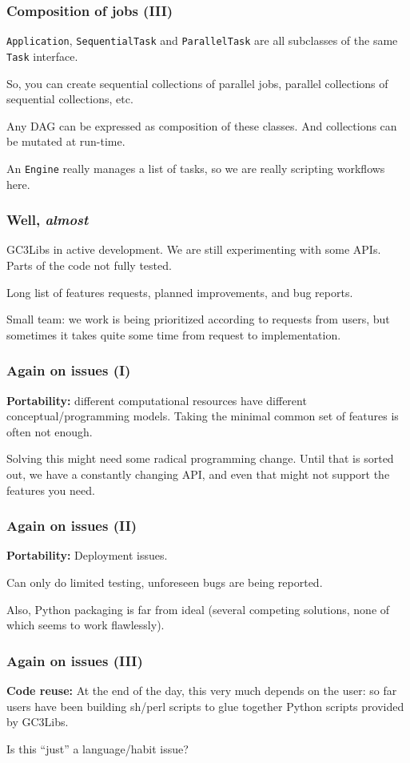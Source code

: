 \documentclass[presentation]{beamer}
\begin{document}
\begin{frame}
\frametitle{Composition of jobs (III)}
\label{sec-25}

  \texttt{Application}, \texttt{SequentialTask} and \texttt{ParallelTask} are all
  subclasses of the same \texttt{Task} interface.

  So, you can create sequential collections of parallel jobs, parallel
  collections of sequential collections, etc.

  Any DAG can be expressed as composition of these classes.
  And collections can be mutated at run-time.

  An \texttt{Engine} really manages a list of tasks, so we are really
  scripting workflows here.
\end{frame}
\begin{frame}
\frametitle{Well, \emph{almost}}
\label{sec-26}


  GC3Libs in active development.  We are still experimenting with some
  APIs.  Parts of the code not fully tested.

  Long list of features requests, planned improvements, and bug
  reports. 

  Small team: we work is being prioritized according to requests from
  users, but sometimes it takes quite some time from request to
  implementation.
  
\end{frame}
\begin{frame}
\frametitle{Again on issues (I)}
\label{sec-27}


  \textbf{Portability:} different computational resources have different
  conceptual/programming models.  Taking the minimal common set of
  features is often not enough. 

  Solving this might need some radical programming change.
  Until that is sorted out, we have a constantly changing API, and
  even that might not support the features you need.
\end{frame}
\begin{frame}
\frametitle{Again on issues (II)}
\label{sec-28}


  \textbf{Portability:} Deployment issues.

  Can only do limited testing, unforeseen bugs are being reported.

  Also, Python packaging is far from ideal (several competing
  solutions, none of which seems to work flawlessly).
\end{frame}
\begin{frame}
\frametitle{Again on issues (III)}
\label{sec-29}


  \textbf{Code reuse:} At the end of the day, this very much depends on the
  user: so far users have been building sh/perl scripts to glue
  together Python scripts provided by GC3Libs.

  Is this ``just'' a language/habit issue?
\end{frame}
\end{document}
